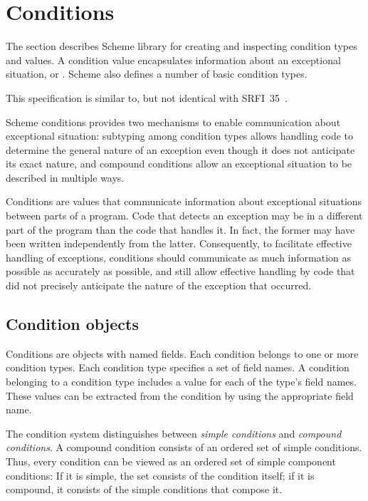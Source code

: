 \section{Conditions}
\label{conditionssection}

The section describes Scheme  library for creating and inspecting
condition types and values. A condition value encapsulates information
about an exceptional situation, or
. Scheme also defines a
number of basic condition types.

\begin{note}
  This specification is similar to, but not identical with
  SRFI~35~\cite{srfi35}.
\end{note}

Scheme conditions provides two mechanisms to enable communication
about exceptional situation: subtyping among condition types allows
handling code to determine the general nature of an exception even
though it does not anticipate its exact nature, and compound
conditions allow an exceptional situation to be described in multiple
ways.

\begin{rationale}
Conditions are values that communicate information about exceptional
situations between parts of a program. Code that detects an exception
may be in a different part of the program than the code that handles
it. In fact, the former may have been written independently from the
latter. Consequently, to facilitate effective handling of exceptions,
conditions should communicate as much information as possible as
accurately as possible, and still allow effective handling by code
that did not precisely anticipate the nature of the exception that
occurred.
\end{rationale}

\subsection{Condition objects}

Conditions are objects with named fields. Each condition belongs to
one or more condition types. Each condition type specifies a set of
field names. A condition belonging to a condition type includes a
value for each of the type's field names. These values can be
extracted from the condition by using the appropriate field name.

The condition system distinguishes between \textit{simple
  conditions} and \textit{compound
  conditions}.  A compound condition
consists of an ordered set of simple conditions.  Thus, every
condition can be viewed as an ordered set of simple component
conditions: If it is simple, the set consists of the condition itself;
if it is compound, it consists of the simple conditions that compose
it.


